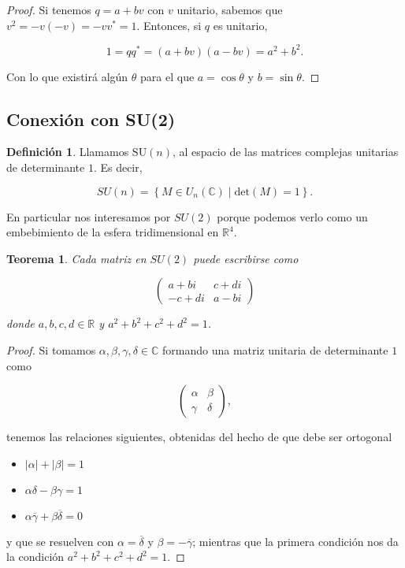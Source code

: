 \documentclass{article}
\theoremstyle{plain}
\newtheorem{theorem}{Teorema}
\theoremstyle{definition}
\newtheorem{definition}{Definición}
\theoremstyle{remark}
\begin{document}
\begin{proof}
  Si tenemos $q = a + bv$ con $v$ unitario, sabemos que $v^2 = - v(-v) = - vv^\ast = 1$.
  Entonces, si $q$ es unitario,

  \[
    1 = qq^\ast = (a+bv)(a-bv) = a^2 + b^2.
  \]

  Con lo que existirá algún $\theta$ para el que $a = \cos \theta$ y $b = \sin \theta$.
\end{proof}

\subsection{Conexión con SU(2)}
\cite{gelfand63}

\begin{definition}
  Llamamos $\mathrm{SU}(n)$, al espacio de las matrices complejas unitarias de determinante $1$.
  Es decir,

  \[SU(n) = \left\{ M \in U_n(\mathbb{C}) \mid \mathrm{det}(M) = 1 \right\}.\]
\end{definition}

En particular nos interesamos por $SU(2)$ porque podemos verlo como un embebimiento de la
esfera tridimensional en $\mathbb{R}^4$.

\begin{theorem}
  Cada matriz en $SU(2)$ puede escribirse como
  
  \[\begin{pmatrix}
      a+bi & c+di \\
      -c+di & a-bi
    \end{pmatrix}\]
  
  donde $a,b,c,d \in \mathbb{R}$ y $a^2+b^2+c^2+d^2 = 1$.
\end{theorem}
\begin{proof}
  Si tomamos $\alpha,\beta,\gamma,\delta \in \mathbb{C}$ formando una matriz unitaria de
  determinante $1$ como

    \[\begin{pmatrix}
      \alpha & \beta \\
      \gamma & \delta
    \end{pmatrix},\]

  tenemos las relaciones siguientes, obtenidas del hecho de que debe ser ortogonal

  \begin{itemize}
    \item $|\alpha|+|\beta| = 1$
    \item $\alpha\delta-\beta\gamma = 1$
    \item $\alpha\overline{\gamma} + \beta\overline{\delta} = 0$
  \end{itemize}
   
  y que se resuelven con $\alpha = \overline{\delta}$ y
  $\beta = -\overline{\gamma}$; mientras que la primera condición
  nos da la condición $a^2+b^2+c^2+d^2 = 1$.
\end{proof}
\end{document}
